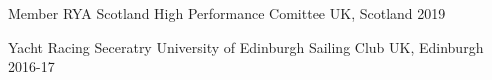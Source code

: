 

\begin{cvhonors}
  \cvhonor
    {Member} %
    {RYA Scotland High Performance Comittee} %
    {UK, Scotland} %
    {2019} %

  \cvhonor
    {Yacht Racing Seceratry} %
    {University of Edinburgh Sailing Club} %
    {UK, Edinburgh} %
    {2016-17} %

\end{cvhonors}
